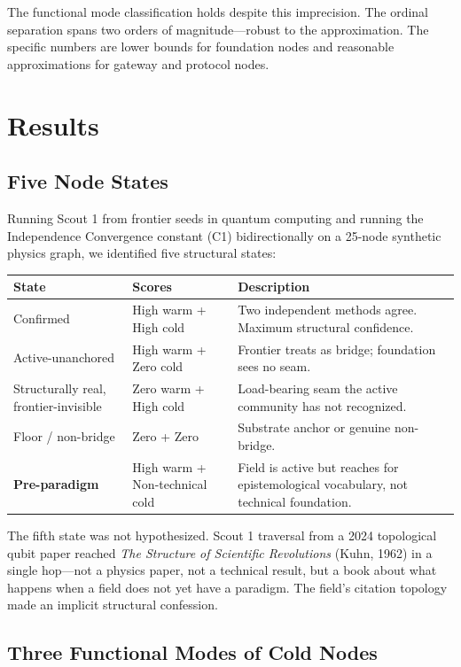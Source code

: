 \documentclass[11pt]{article}
\begin{document}
The functional mode classification holds despite this imprecision. The ordinal separation spans two orders of magnitude---robust to the approximation. The specific numbers are lower bounds for foundation nodes and reasonable approximations for gateway and protocol nodes.

\section{Results}

\subsection{Five Node States}

Running Scout 1 from frontier seeds in quantum computing and running the Independence Convergence constant (C1) bidirectionally on a 25-node synthetic physics graph, we identified five structural states:

\begin{center}
\begin{tabular}{llp{7cm}}
\toprule
\textbf{State} & \textbf{Scores} & \textbf{Description} \\
\midrule
Confirmed & High warm + High cold & Two independent methods agree. Maximum structural confidence. \\
Active-unanchored & High warm + Zero cold & Frontier treats as bridge; foundation sees no seam. \\
Structurally real, frontier-invisible & Zero warm + High cold & Load-bearing seam the active community has not recognized. \\
Floor / non-bridge & Zero + Zero & Substrate anchor or genuine non-bridge. \\
\textbf{Pre-paradigm} & High warm + Non-technical cold & Field is active but reaches for epistemological vocabulary, not technical foundation. \\
\bottomrule
\end{tabular}
\end{center}

The fifth state was not hypothesized. Scout 1 traversal from a 2024 topological qubit paper reached \textit{The Structure of Scientific Revolutions} (Kuhn, 1962) in a single hop---not a physics paper, not a technical result, but a book about what happens when a field does not yet have a paradigm. The field's citation topology made an implicit structural confession.

\subsection{Three Functional Modes of Cold Nodes}
\end{document}
